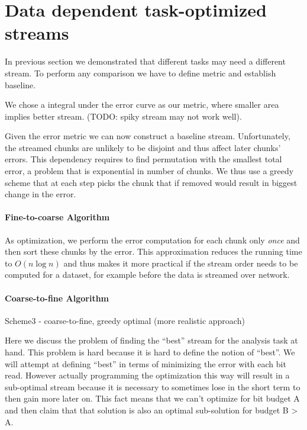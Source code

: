\section{Data dependent task-optimized streams}

In previous section we demonstrated that different tasks may need a different stream. To perform any comparison
we have to define metric and establish baseline.

We chose a integral under the error curve as our metric, where smaller area implies better stream. (TODO: spiky
stream may not work well).


Given the error metric we can now construct a baseline stream. Unfortunately, the streamed chunks are unlikely
to be disjoint and thus affect later chunks' errors. This dependency requires to find permutation with the smallest
total error, a problem that is exponential in number of chunks. We thus use a greedy scheme that at each step picks
the chunk that if removed would result in biggest change in the error.

\paragraph*{Fine-to-coarse Algorithm}

As optimization, we perform the error computation for each chunk only {\em once} and then sort these chunks
by the error. This approximation reduces the running time to $O(n \log n)$ and thus makes it more practical if
the stream order needs to be computed for a dataset, for example before the data is streamed over network.


\paragraph*{Coarse-to-fine Algorithm}

Scheme3 - coarse-to-fine, greedy optimal (more realistic approach)


Here we discuss the problem of finding the ``best'' stream for the analysis task at hand. This problem is hard because it is hard to define the notion of ``best''. We will attempt at defining ``best'' in terms of minimizing the error with each bit read. However actually programming the optimization this way will result in a sub-optimal stream because it is necessary to sometimes lose in the short term to then gain more later on. This fact means that we can't optimize for bit budget A and then claim that that solution is also an optimal sub-solution for budget B > A.


